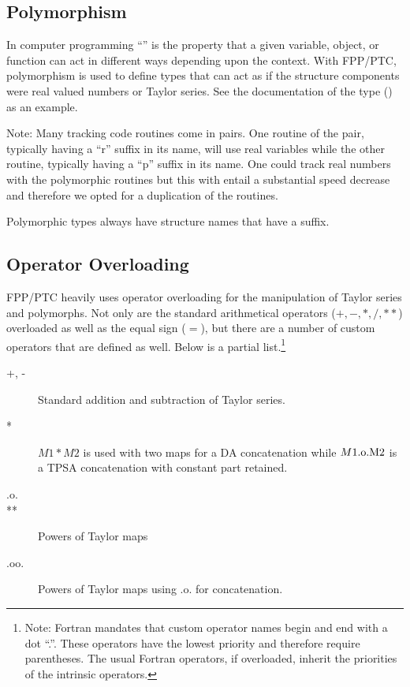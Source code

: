 \documentclass{hitec}     %
\begin{document}
\subsection{Polymorphism}
\label{s:poly}

In computer programming ``'' is the property that a given variable, object, or
function can act in different ways depending upon the context. With FPP/PTC, polymorphism is used to
define types that can act as if the structure components were real valued numbers or Taylor series.
See the documentation of the  type () as an example.

Note: Many  tracking code routines come in pairs. One routine of the pair, typically having a 
``r'' suffix in its name, will use real variables while the other routine, typically having a ``p'' suffix 
in its name. {\color{h} One could track real numbers with the polymorphic routines but this with entail a substantial speed decrease and therefore we opted for a duplication of the routines.}

Polymorphic types always have structure names that have a 
suffix.

\subsection{Operator Overloading}
\label{s:overloading}

FPP/PTC heavily uses operator overloading for  the manipulation of Taylor series  and polymorphs. Not only are the standard
arithmetical operators ($+, -, *, /, **$) overloaded as well as the equal sign ($=$), but there are
a number of custom operators that are defined as well. Below is a partial list.\footnote
  {\color{h}
Note: Fortran mandates that custom operator names begin and end with a dot ``.''. These operators have the lowest priority and therefore require parentheses. The usual Fortran operators, if overloaded, inherit the priorities of the intrinsic operators. 
  }
\begin{description}
\item[+, -] \Newline
Standard addition and subtraction of Taylor series.
%
\item[*] \Newline
$M1 * M2$ is used with two maps for  {\color{h} a DA concatenation while  $M1 \rm{.o.} M2$ is a TPSA concatenation with constant part retained.}
%
\item[.o.] \Newline

\item[**] \Newline   Powers of Taylor maps

\item[.oo.] \Newline Powers of Taylor maps using .o. for concatenation.

\end{description}
\end{document}
